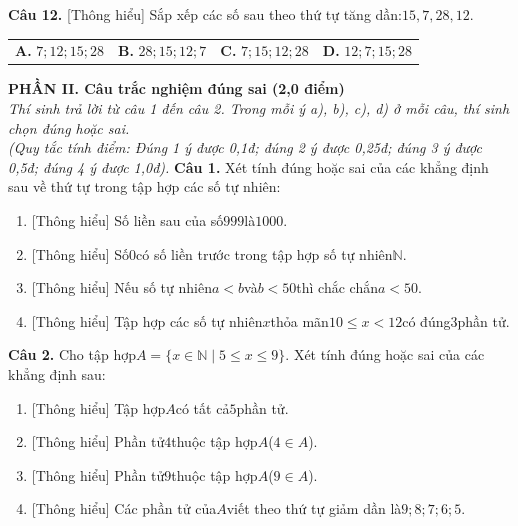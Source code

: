 \documentclass[11pt,a4paper]{article}
\begin{document}
\noindent\textbf{Câu 12.} [Thông hiểu] Sắp xếp các số sau theo thứ tự tăng dần:$15, 7, 28, 12$.\par\vspace{2pt}
\noindent\begin{tabular*}{\textwidth}{@{\extracolsep{\fill}}llll@{}}
\textbf{A.} $7; 12; 15; 28$ & \textbf{B.} $28; 15; 12; 7$ & \textbf{C.} $7; 15; 12; 28$ & \textbf{D.} $12; 7; 15; 28$
\end{tabular*}\par\vspace{5pt}


\vspace{6pt}
\noindent
\textbf{\large PHẦN II. Câu trắc nghiệm đúng sai (2,0 điểm)}\\
\textit{\small Thí sinh trả lời từ câu 1 đến câu 2. Trong mỗi ý a), b), c), d) ở mỗi câu, thí sinh chọn đúng hoặc sai.}\\
\textit{\small (Quy tắc tính điểm: Đúng 1 ý được 0,1đ; đúng 2 ý được 0,25đ; đúng 3 ý được 0,5đ; đúng 4 ý được 1,0đ).}
\vspace{6pt}
\noindent\textbf{Câu 1.} Xét tính đúng hoặc sai của các khẳng định sau về thứ tự trong tập hợp các số tự nhiên:\par\vspace{2pt}
\begin{enumerate}[label=\textbf{\alph*)}, leftmargin=1.2cm, itemsep=2pt, topsep=2pt]
  \item \textnormal{[Thông hiểu]} Số liền sau của số$999$là$1000$.
  \item \textnormal{[Thông hiểu]} Số$0$có số liền trước trong tập hợp số tự nhiên$\mathbb{N}$.
  \item \textnormal{[Thông hiểu]} Nếu số tự nhiên$a < b$và$b < 50$thì chắc chắn$a < 50$.
  \item \textnormal{[Thông hiểu]} Tập hợp các số tự nhiên$x$thỏa mãn$10 \le x < 12$có đúng$3$phần tử.
\end{enumerate}
\vspace{6pt}

\noindent\textbf{Câu 2.} Cho tập hợp$A = \{x \in \mathbb{N} \mid 5 \le x \le 9\}$. Xét tính đúng hoặc sai của các khẳng định sau:\par\vspace{2pt}
\begin{enumerate}[label=\textbf{\alph*)}, leftmargin=1.2cm, itemsep=2pt, topsep=2pt]
  \item \textnormal{[Thông hiểu]} Tập hợp$A$có tất cả$5$phần tử.
  \item \textnormal{[Thông hiểu]} Phần tử$4$thuộc tập hợp$A$($4 \in A$).
  \item \textnormal{[Thông hiểu]} Phần tử$9$thuộc tập hợp$A$($9 \in A$).
  \item \textnormal{[Thông hiểu]} Các phần tử của$A$viết theo thứ tự giảm dần là$9; 8; 7; 6; 5$.
\end{enumerate}
\vspace{6pt}
\end{document}
